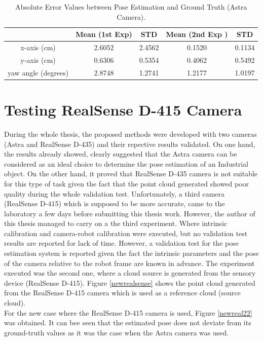 \begin{table}[ht]
\renewcommand{\arraystretch}{1.3}
\caption{Absolute Error Values between Pose Estimation and Ground Truth (Astra Camera).}
\label{absolute}
\centering
\begin{tabular}{|c|c|c|c|c|}
\hline
  & Mean (1st Exp)& STD &  Mean (2nd Exp )& STD \\
\hline
x-axis (cm) & 2.6052 & 2.4562 & 0.1520 & 0.1134\\
\hline
y-axis (cm) & 0.6306 & 0.5354 & 0.4062 & 0.5492\\
\hline
yaw angle (degrees)& 2.8748 & 1.2741 & 1.2177 & 1.0197\\
\hline
\end{tabular}
\end{table}

\section{Testing RealSense D-415 Camera} \label{thirds}

During the whole thesis, the proposed methods were developed with two cameras (Astra and RealSense D-435) and their repective results validated. On one hand, the results already showed, clearly suggested that the Astra camera can be considered as an ideal choice to determine the pose estimation of an Industrial object. On the other hand, it proved that RealSense D-435 camera is not suitable for this type of task given the fact that the point cloud generated showed poor quality during the whole validation test. Unfortunately, a third camera (RealSense D-415) which is supposed to be more accurate, came to the laboratory a few days before submitting this thesis work. However, the author of this thesis managed to carry on a the third experiment. Where intrinsic calibration and camera-robot calibration were executed, but no validation test results are reported for lack of time. However, a validation test for the pose estimation system is reported given the fact the intrinsic parameters and the pose of the camera relative to the robot frame are known in advance. The experiment executed was the second one, where a cloud source is generated from the sensory device (RealSense D-415). Figure \ref{newrealsense} shows the point cloud generated from the RealSense D-415 camera which is used as a reference cloud (source cloud).\\
For the new case where the RealSense D-415 camera is used, Figure \ref{newreal22} was obtained. It can bee seen that the estimated pose does not deviate from its ground-truth values as it was the case when the Astra camera was used.

